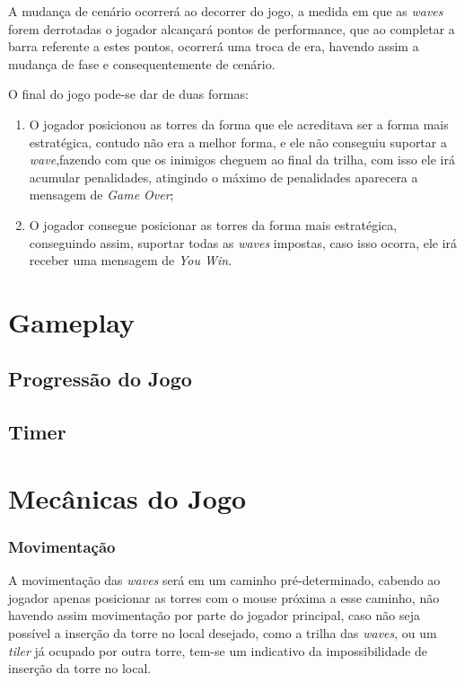 \documentclass[11pt]{article} %
\begin{document}
A mudança de cenário ocorrerá ao decorrer do jogo, a medida em que as \textit{waves} forem derrotadas o jogador alcançará pontos de performance, que ao completar a barra referente a estes pontos, ocorrerá uma troca de era, havendo assim a mudança de fase e consequentemente de cenário. 

O final do jogo pode-se dar de duas formas:

\begin{enumerate}
\item O jogador posicionou as torres da forma que ele acreditava ser a forma mais estratégica, contudo não era a melhor forma, e ele não conseguiu suportar a \textit{wave},fazendo com que os inimigos cheguem ao final da trilha, com isso ele irá acumular penalidades, atingindo o máximo de penalidades aparecera a mensagem de \textit{Game Over};
\item O jogador consegue posicionar as torres da forma mais estratégica, conseguindo assim, suportar todas as \textit{waves} impostas, caso isso ocorra, ele irá receber uma mensagem de \textit{You Win}.

\end{enumerate}

\section{Gameplay}

\subsection{Progressão do Jogo}

\subsection{Timer}

\newpage

\section{Mecânicas do Jogo}
\subsubsection{Movimentação}
A movimentação das \textit{waves} será em um caminho pré-determinado, cabendo ao jogador apenas posicionar as torres com o mouse próxima a esse caminho, não havendo assim movimentação por parte do jogador principal, caso não seja possível a inserção da torre no local desejado, como a trilha das \textit{waves}, ou um \textit{tiler} já ocupado por outra torre, tem-se um indicativo da impossibilidade de inserção da torre no local.
\end{document}
